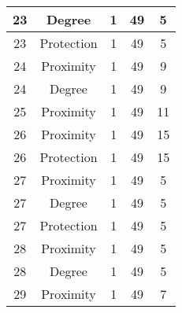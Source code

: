 \documentclass[results.tex]{subfiles}
\begin{document}
\begin{center}
\begin{tabular}{| c || c | c | c | c |}
            \hline
            23                      & Degree                       & 1                      & 49                      & 5                    \\
            \hline
            23                      & Protection                   & 1                      & 49                      & 5                    \\
            \hline
            24                      & Proximity                    & 1                      & 49                      & 9                    \\
            \hline
            24                      & Degree                       & 1                      & 49                      & 9                    \\
            \hline
            25                      & Proximity                    & 1                      & 49                      & 11                   \\
            \hline
            26                      & Proximity                    & 1                      & 49                      & 15                   \\
            \hline
            26                      & Protection                   & 1                      & 49                      & 15                   \\
            \hline
            27                      & Proximity                    & 1                      & 49                      & 5                    \\
            \hline
            27                      & Degree                       & 1                      & 49                      & 5                    \\
            \hline
            27                      & Protection                   & 1                      & 49                      & 5                    \\
            \hline
            28                      & Proximity                    & 1                      & 49                      & 5                    \\
            \hline
            28                      & Degree                       & 1                      & 49                      & 5                    \\
            \hline
            29                      & Proximity                    & 1                      & 49                      & 7                    \\

\end{tabular}
\end{center}
\end{document}
